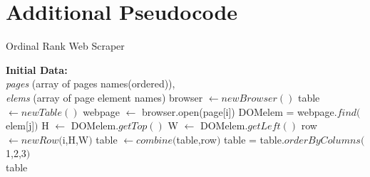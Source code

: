 
\chapter{Additional Pseudocode} %

\label{AppendixA} %


\begin{algorithm}[h!]
	\caption{Ordinal Rank Web Scraper}\label{alg:ordProg}
	\begin{algorithmic}[1]
		\State \textbf{Initial Data:} \\
		\textit{pages} (array of pages names(ordered)),\\ 
		\textit{elems} (array of page element names)
		\State browser $\gets newBrowser()$ 
		\State table $\gets newTable()$ 
		\State webpage $\gets$ browser.open(page[i])
		\State DOMelem = webpage$.find($elem[j]$)$ 
		\State H $\gets$ DOMelem$.getTop()$
		\State W $\gets$ DOMelem$.getLeft()$
		\State row $\gets newRow($i,H,W$)$ 
		\State table $\gets combine($table,row$)$
		\EndIf
		\EndFor 
		\EndFor
		\State table = table$.orderByColumns($1,2,3$)$\\
		\Return table
		\EndFunction
		
		
	\end{algorithmic}
\end{algorithm}